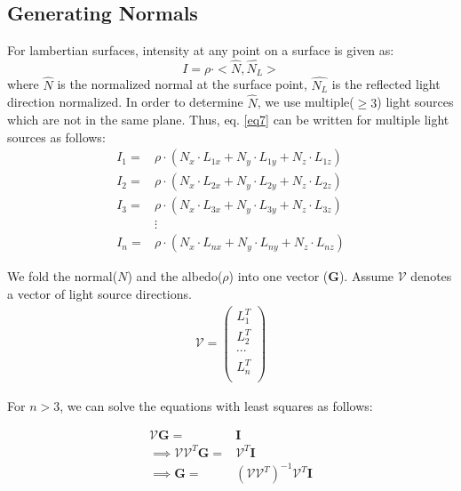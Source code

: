 \documentclass[11pt]{article}
\newcommand{\Vv}{\mathcal{V}}
\newcommand{\GB}{\mathbf{G}}
\newcommand{\IB}{\mathbf{I}}
\begin{document}
 \subsection{Generating Normals}
 \vspace{-10pt}
 For lambertian surfaces, intensity at any point on a surface is given as:
  \vspace{-10pt}
 \begin{equation}
    I = \rho \cdot <\hat{N},\hat{ N_L} >
    \label{eq7}
 \end{equation}
 where $\hat{N}$ is the normalized normal at the surface point, $\hat{N_L}$ is the reflected light direction normalized. 	In order to determine $\hat{N}$, we use multiple($\ge3$) light sources which are not in the same plane. Thus, eq. \ref{eq7} can be written for multiple light sources as follows:
 \vspace{-10pt}
 \begin{align*}
  I_1 =& \rho \cdot ( N_x \cdot L_{1x} + N_y \cdot L_{1y} + N_z \cdot L_{1z}) \\
  I_2 =& \rho \cdot ( N_x \cdot L_{2x} + N_y \cdot L_{2y} + N_z \cdot L_{2z}) \\
  I_3 =& \rho \cdot ( N_x \cdot L_{3x} + N_y \cdot L_{3y} + N_z \cdot L_{3z}) \\
     &  \vdots \\
  I_n =& \rho \cdot ( N_x \cdot L_{nx} + N_y \cdot L_{ny} + N_z \cdot L_{nz}) 
 \end{align*}

We fold the normal($N$) and the albedo($\rho$) into one vector (\textbf{G}). Assume $\mathbf{\Vv}$ denotes a vector of light source directions.
\vspace{-10pt}
\begin{align*}
\mathbf{\Vv} = \begin{pmatrix} 
  L_1^{T} \\
  L_2^{T} \\
  \cdots \\
  L_n^{T} \\
\end{pmatrix}
\end{align*}

For $n > 3$, we can solve the equations with least squares as follows:

\begin{align*}
  \Vv \GB =& \IB \\
 \implies  \Vv \Vv^{T} \GB =& \Vv^{T} \IB \\
 \implies \GB =&  (\Vv \Vv^{T})^{-1} \Vv^{T} \IB \\
\end{align*}
\end{document}

